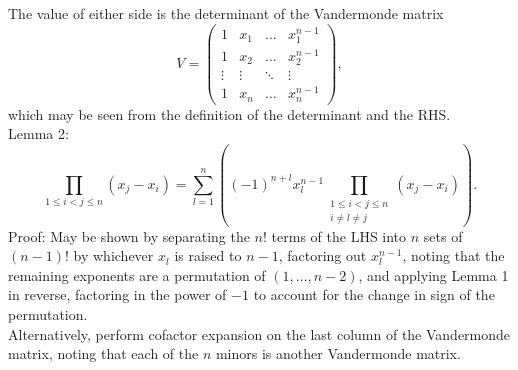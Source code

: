 \documentclass{article}
\begin{document}
The value of either side is the determinant of the Vandermonde matrix
\[
V=
\begin{pmatrix}
  1 & x_1 & \ldots & x_1^{n-1} \\
  1 & x_2 & \ldots & x_2^{n-1} \\
  \vdots & \vdots & \ddots & \vdots \\
  1 & x_n & \ldots & x_n^{n-1}
\end{pmatrix},
\]
which may be seen from the definition of the determinant and the RHS. \\

Lemma 2:
\[\prod_{1 \leq i < j \leq n} (x_j-x_i)
= \sum_{l=1}^n\left((-1)^{n+l}x_l^{n-1}\prod_{\substack{1 \leq i < j \leq n \\ i \neq l \neq j}}(x_j-x_i)\right).\]
Proof: May be shown by separating the $n!$ terms of the LHS into $n$ sets of $(n-1)!$
by whichever $x_l$ is raised to $n-1$, factoring out $x_l^{n-1}$,
noting that the remaining exponents are a permutation of $(1, \ldots, n-2)$,
and applying Lemma 1 in reverse,
factoring in the power of $-1$ to account for the change in sign of the permutation. \\
Alternatively, perform cofactor expansion on the last column of the Vandermonde matrix,
noting that each of the $n$ minors is another Vandermonde matrix. \\

\newpage
\end{document}
